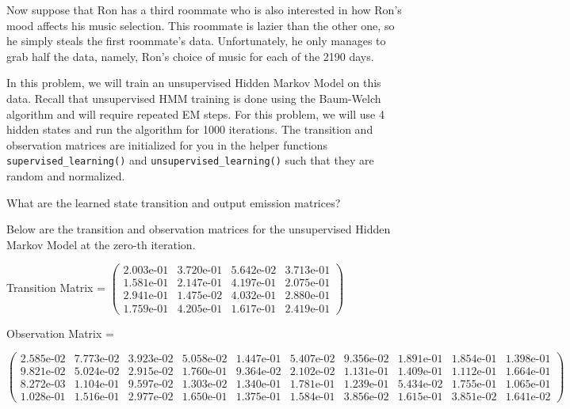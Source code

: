 \begin{solution}
\end{solution}
\indent\problem[15] %
Now suppose that Ron has a third roommate who is also interested in how Ron's mood affects his music selection. This roommate is lazier than the other one, so he simply steals the first roommate's data. Unfortunately, he only manages to grab half the data, namely, Ron's choice of music for each of the 2190 days.

In this problem, we will train an unsupervised Hidden Markov Model on this data. Recall that unsupervised HMM training is done using the Baum-Welch algorithm and will require repeated EM steps. For this problem, we will use 4 hidden states and run the algorithm for 1000 iterations. The transition and observation matrices are initialized for you in the helper functions \texttt{supervised\_learning()} and \texttt{unsupervised\_learning()} such that they are random and normalized.

What are the learned state transition and output emission matrices?

Below are the transition and observation matrices for the unsupervised Hidden Markov Model at the zero-th iteration.

Transition Matrix = \small $\begin{pmatrix}
2.003\text{e-}01 & 3.720\text{e-}01 & 5.642\text{e-}02 & 3.713\text{e-}01\\
1.581\text{e-}01 & 2.147\text{e-}01 & 4.197\text{e-}01 & 2.075\text{e-}01\\
2.941\text{e-}01 & 1.475\text{e-}02 & 4.032\text{e-}01 & 2.880\text{e-}01\\
1.759\text{e-}01 & 4.205\text{e-}01 & 1.617\text{e-}01 & 2.419\text{e-}01 
\end{pmatrix}$
\normalsize

Observation Matrix =

\small
$\begin{pmatrix}
2.585\text{e-}02 & 7.773\text{e-}02 & 3.923\text{e-}02 & 5.058\text{e-}02 & 1.447\text{e-}01 & 5.407\text{e-}02 & 9.356\text{e-}02 & 1.891\text{e-}01 & 1.854\text{e-}01 & 1.398\text{e-}01\\
9.821\text{e-}02 & 5.024\text{e-}02 & 2.915\text{e-}02 & 1.760\text{e-}01 & 9.364\text{e-}02 & 2.102\text{e-}02 & 1.131\text{e-}01 & 1.409\text{e-}01 & 1.112\text{e-}01 & 1.664\text{e-}01\\
8.272\text{e-}03 & 1.104\text{e-}01 & 9.597\text{e-}02 & 1.303\text{e-}02 & 1.340\text{e-}01 & 1.781\text{e-}01 & 1.239\text{e-}01 & 5.434\text{e-}02 & 1.755\text{e-}01 & 1.065\text{e-}01\\
1.028\text{e-}01 & 1.516\text{e-}01 & 2.977\text{e-}02 & 1.650\text{e-}01 & 1.375\text{e-}01 & 1.584\text{e-}01 & 3.856\text{e-}02 & 1.615\text{e-}01 & 3.851\text{e-}02 & 1.641\text{e-}02 
\end{pmatrix}$
\normalsize
\medskip

